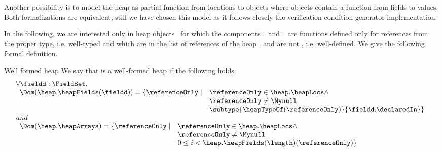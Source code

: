  Another possibility is to model the heap as partial function from locations to objects where objects contain a function from 
 fields to values. Both formalizations are equivalent, still we have chosen this model as it follows closely the
 verification condition generator implementation.

 In the following, we are interested only in  heap objects \heap \ for which the components
 \heap.\heapFields \ and \heap.\heapArrays \ are functions defined only for references from the proper
 type, i.e. well-typed and which are in the list of references of the heap \heap.\heapLocs{} and are not \Mynull, i.e. well-defined.
We give the following formal definition.
\begin{heapDef}{Well formed heap}\label{heap:wf}
We say that \heap{} is a well-formed heap if the following holds: 
  $$\begin{array}{l}
           \forall  \fieldd : \FieldSet,   \\
   \begin{array}{ll} 
   \Dom( \heap.\heapFields(\fieldd))  =    \{ \referenceOnly \mid &	
                \referenceOnly  \in \heap.\heapLocs  \wedge \\
 	        &  \referenceOnly \neq \Mynull\\
  	        & \subtype{ \heapTypeOf(\referenceOnly ) }{\fieldd.\declaredIn} \}  
     \end{array}
	  \\
 	  and  \\
 	  \begin{array}{ll}  \Dom (\heap.\heapArrays) = \{  \referenceOnly \mid 	&  \referenceOnly  \in  \heap.\heapLocs \wedge \\ 
 	  &  \referenceOnly \neq \Mynull\\
 	  &  0 \leq i < \heap.\heapFields( \length)( \referenceOnly)   \}  
     \end{array}
 	 
    \end{array}
   $$
\end{heapDef}
%	 


